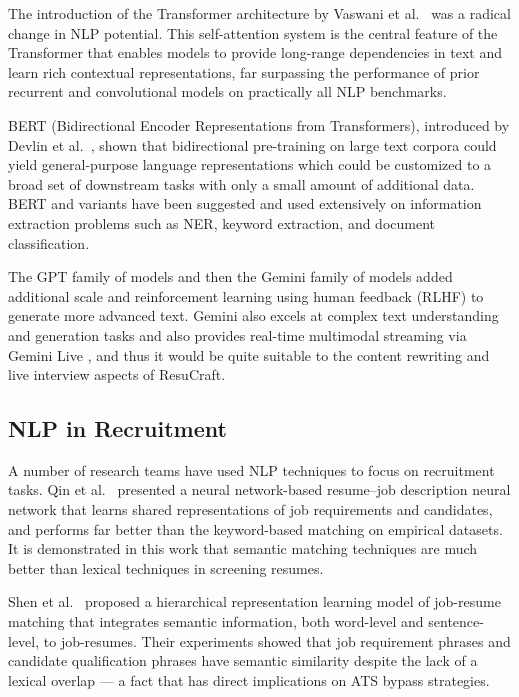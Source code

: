 \documentclass[12pt, a4paper, oneside]{report}
\begin{document}
The introduction of the Transformer architecture by Vaswani et al.\ \cite{vaswani2017} was a radical change in NLP potential. This self-attention system is the central feature of the Transformer that enables models to provide long-range dependencies in text and learn rich contextual representations, far surpassing the performance of prior recurrent and convolutional models on practically all NLP benchmarks.

BERT (Bidirectional Encoder Representations from Transformers), introduced by Devlin et al.\ \cite{devlin2019}, shown that bidirectional pre-training on large text corpora could yield general-purpose language representations which could be customized to a broad set of downstream tasks with only a small amount of additional data. BERT and variants have been suggested and used extensively on information extraction problems such as NER, keyword extraction, and document classification.

The GPT family of models \cite{brown2020} and then the Gemini family of models \cite{gemini2023} added additional scale and reinforcement learning using human feedback (RLHF) to generate more advanced text. Gemini also excels at complex text understanding and generation tasks and also provides real-time multimodal streaming via Gemini Live \cite{geminidocs2024}, and thus it would be quite suitable to the content rewriting and live interview aspects of ResuCraft.

\subsection{NLP in Recruitment}

A number of research teams have used NLP techniques to focus on recruitment tasks. Qin et al.\ \cite{qin2018} presented a neural network-based resume--job description neural network that learns shared representations of job requirements and candidates, and performs far better than the keyword-based matching on empirical datasets. It is demonstrated in this work that semantic matching techniques are much better than lexical techniques in screening resumes.

Shen et al.\ \cite{shen2018} proposed a hierarchical representation learning model of job-resume matching that integrates semantic information, both word-level and sentence-level, to job-resumes. Their experiments showed that job requirement phrases and candidate qualification phrases have semantic similarity despite the lack of a lexical overlap --- a fact that has direct implications on ATS bypass strategies.
\end{document}

